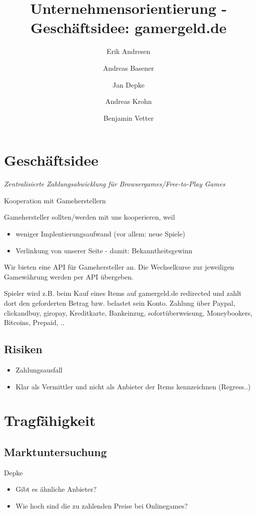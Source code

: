 \documentclass[a4paper,10pt]{article}
\title{Unternehmensorientierung - Geschäftsidee: gamergeld.de}
\author{Erik Andresen \and Andreas Basener \and Jan Depke \and Andreas Krohn \and Benjamin Vetter}
\begin{document}
\maketitle

\section{Geschäftsidee}
\emph{Zentralisierte Zahlungsabwicklung für Browsergames/Free-to-Play Games}

Kooperation mit Gameherstellern

Gamehersteller sollten/werden mit uns kooperieren, weil
\begin{itemize}
  \item weniger Implentierungsaufwand (vor allem: neue Spiele)
  \item Verlinkung von unserer Seite - damit: Bekanntheitsgewinn
\end{itemize}

Wir bieten eine API für Gamehersteller an.
Die Wechselkurse zur jeweiligen Gamewährung werden per API übergeben.

Spieler wird z.B. beim Kauf eines Items auf gamergeld.de redirected und zahlt dort den geforderten Betrag bzw. belastet sein Konto.
Zahlung über Paypal, clickandbuy, giropay, Kreditkarte, Bankeinzug, sofortüberweisung, Moneybookers, Bitcoins, Prepaid, ..

\subsection{Risiken}
\begin{itemize}
  \item Zahlungsausfall
  \item Klar als Vermittler und nicht als Anbieter der Items kennzeichnen (Regress..)
\end{itemize}

\section{Tragfähigkeit}

\subsection{Marktuntersuchung}
Depke
\begin{itemize}
  \item Gibt es ähnliche Anbieter?
  \item Wie hoch sind die zu zahlenden Preise bei Onlinegames?
\end{itemize}
\end{document}
